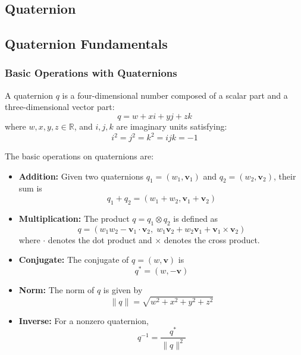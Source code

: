 \documentclass{iutbscthesis}
\begin{document}

\printbib

\begin{appendices}

\chapter{Quaternion} 

\section{Quaternion Fundamentals}

\subsection{Basic Operations with Quaternions}

A quaternion $q$ is a four-dimensional number composed of a scalar part and a three-dimensional vector part:
\[
q = w + xi + yj + zk
\]
where $w, x, y, z \in \mathbb{R}$, and $i, j, k$ are imaginary units satisfying:
\[
i^2 = j^2 = k^2 = ijk = -1
\]

The basic operations on quaternions are:

\begin{itemize}
    \item \textbf{Addition:} Given two quaternions $q_1 = (w_1, \mathbf{v}_1)$ and $q_2 = (w_2, \mathbf{v}_2)$, their sum is
    \[
    q_1 + q_2 = (w_1 + w_2, \mathbf{v}_1 + \mathbf{v}_2)
    \]
    
    \item \textbf{Multiplication:} The product $q = q_1 \otimes q_2$ is defined as
    \[
    q = (w_1w_2 - \mathbf{v}_1 \cdot \mathbf{v}_2,\; w_1\mathbf{v}_2 + w_2\mathbf{v}_1 + \mathbf{v}_1 \times \mathbf{v}_2)
    \]
    where $\cdot$ denotes the dot product and $\times$ denotes the cross product.
    
    \item \textbf{Conjugate:} The conjugate of $q = (w, \mathbf{v})$ is
    \[
    q^* = (w, -\mathbf{v})
    \]
    
    \item \textbf{Norm:} The norm of $q$ is given by
    \[
    \|q\| = \sqrt{w^2 + x^2 + y^2 + z^2}
    \]
    
    \item \textbf{Inverse:} For a nonzero quaternion,
    \[
    q^{-1} = \frac{q^*}{\|q\|^2}
    \]
\end{itemize}


\end{appendices}
\end{document}
